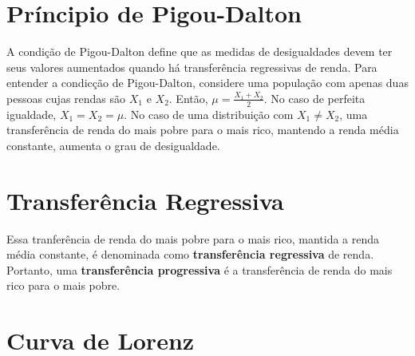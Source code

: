 \documentclass[
]{book}
\begin{document}
\hypertarget{pruxedncipio-de-pigou-dalton}{%
\section{Príncipio de Pigou-Dalton}\label{pruxedncipio-de-pigou-dalton}}

A condição de Pigou-Dalton define que as medidas de desigualdades devem ter seus valores aumentados quando há transferência regressivas de renda.
Para entender a condicção de Pigou-Dalton, considere uma população com apenas duas pessoas cujas rendas são \(X_1\) e \(X_2\). Então, \(\mu = \frac{X_1 + X_2}{2}\). No caso de perfeita igualdade, \(X_1 = X_2 = \mu\). No caso de uma distribuição com \(X_1 \neq X_2\), uma transferência de renda do mais pobre para o mais rico, mantendo a renda média constante, aumenta o grau de desigualdade.

\hypertarget{transferuxeancia-regressiva}{%
\section{Transferência Regressiva}\label{transferuxeancia-regressiva}}

Essa tranferência de renda do mais pobre para o mais rico, mantida a renda média constante, é denominada como \textbf{transferência regressiva} de renda. Portanto, uma \textbf{transferência progressiva} é a transferência de renda do mais rico para o mais pobre.

\hypertarget{curva-de-lorenz}{%
\section{Curva de Lorenz}\label{curva-de-lorenz}}
\end{document}
